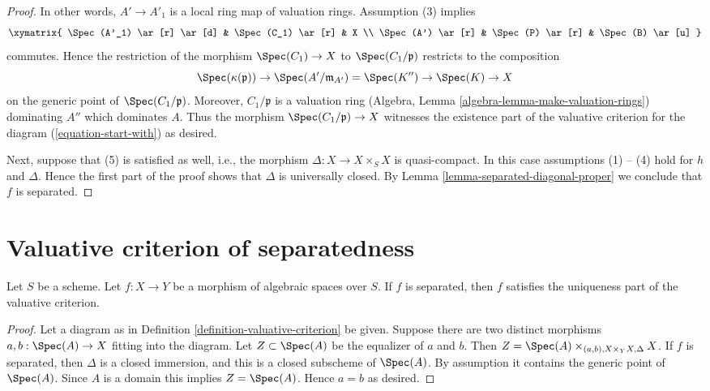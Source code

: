 \begin{proof}
In other words, $A' \to A'_1$ is a local ring map of valuation
rings. Assumption (3) implies
$$
\xymatrix{
\Spec(A'_1) \ar[r] \ar[d] & \Spec(C_1) \ar[r] & X \\
\Spec(A') \ar[r] & \Spec(P) \ar[r] & \Spec(B) \ar[u]
}
$$
commutes. Hence the restriction of the morphism $\Spec(C_1) \to X$
to $\Spec(C_1/\mathfrak p)$ restricts to the composition
$$
\Spec(\kappa(\mathfrak p)) \to
\Spec(A'/\mathfrak m_{A'}) = \Spec(K'') \to
\Spec(K) \to X
$$
on the generic point of $\Spec(C_1/\mathfrak p)$. Moreover,
$C_1/\mathfrak p$ is a valuation ring
(Algebra, Lemma \ref{algebra-lemma-make-valuation-rings})
dominating $A''$ which dominates $A$.
Thus the morphism $\Spec(C_1/\mathfrak p) \to X$ witnesses the
existence part of the valuative criterion for the diagram
(\ref{equation-start-with}) as desired.

\medskip\noindent
Next, suppose that (5) is satisfied as well, i.e., the morphism
$\Delta : X \to X \times_S X$ is quasi-compact. In this case
assumptions (1) -- (4) hold for $h$ and $\Delta$. Hence the first
part of the proof shows that $\Delta$ is universally closed.
By Lemma \ref{lemma-separated-diagonal-proper} we conclude that
$f$ is separated.
\end{proof}

















\section{Valuative criterion of separatedness}
\label{section-valuative-separatedness}

\begin{lemma}
\label{lemma-separated-implies-valuative}
Let $S$ be a scheme.
Let $f : X \to Y$ be a morphism of algebraic spaces over $S$.
If $f$ is separated, then $f$ satisfies the uniqueness
part of the valuative criterion.
\end{lemma}

\begin{proof}
Let a diagram as in Definition \ref{definition-valuative-criterion}
be given. Suppose there are two distinct morphisms
$a, b : \Spec(A) \to X$ fitting into the diagram.
Let $Z \subset \Spec(A)$ be the equalizer of $a$ and $b$.
Then $Z = \Spec(A) \times_{(a, b), X \times_Y X, \Delta} X$.
If $f$ is separated, then $\Delta$ is a closed immersion, and
this is a closed subscheme of $\Spec(A)$. By assumption it contains
the generic point of $\Spec(A)$. Since $A$ is a domain
this implies $Z = \Spec(A)$. Hence $a = b$ as desired.
\end{proof}

